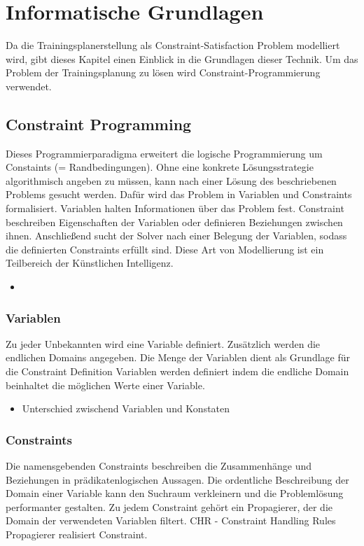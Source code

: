\chapter{Informatische Grundlagen}
\label{sec:grundlagen:info}
Da die Trainingsplanerstellung als Constraint-Satisfaction Problem modelliert wird, gibt dieses Kapitel einen Einblick in die Grundlagen dieser Technik.
Um das Problem der Trainingsplanung zu lösen wird Constraint-Programmierung verwendet.\cite{ConstraintProgrammierung} 

\section{Constraint Programming}
Dieses Programmierparadigma erweitert die logische Programmierung um Constaints (= Randbedingungen). Ohne eine konkrete Lösungsstrategie algorithmisch angeben zu müssen, kann nach einer Lösung des beschriebenen Problems gesucht werden. Dafür wird das Problem in Variablen und Constraints formalisiert. Variablen halten Informationen über das Problem fest. Constraint beschreiben Eigenschaften der Variablen oder definieren Beziehungen zwischen ihnen. Anschließend sucht der Solver nach einer Belegung der Variablen, sodass die definierten Constraints erfüllt sind. Diese Art von Modellierung ist ein Teilbereich der Künstlichen Intelligenz.
\begin{itemize}
    \item 
\end{itemize}

\subsection{Variablen}
Zu jeder Unbekannten wird eine Variable definiert. Zusätzlich werden die endlichen Domains angegeben. Die Menge der Variablen dient als Grundlage für die Constraint Definition
Variablen werden definiert indem die endliche Domain beinhaltet die möglichen Werte einer Variable.
\begin{itemize}
    \item Unterschied zwischend Variablen und Konstaten
\end{itemize}

\subsection{Constraints}
Die namensgebenden Constraints beschreiben die Zusammenhänge und Beziehungen in prädikatenlogischen Aussagen. Die ordentliche Beschreibung der Domain einer Variable kann den Suchraum verkleinern und die Problemlösung performanter gestalten. Zu jedem Constraint gehört ein Propagierer, der die Domain der verwendeten Variablen filtert.
CHR - Constraint Handling Rules
Propagierer realisiert Constraint.

